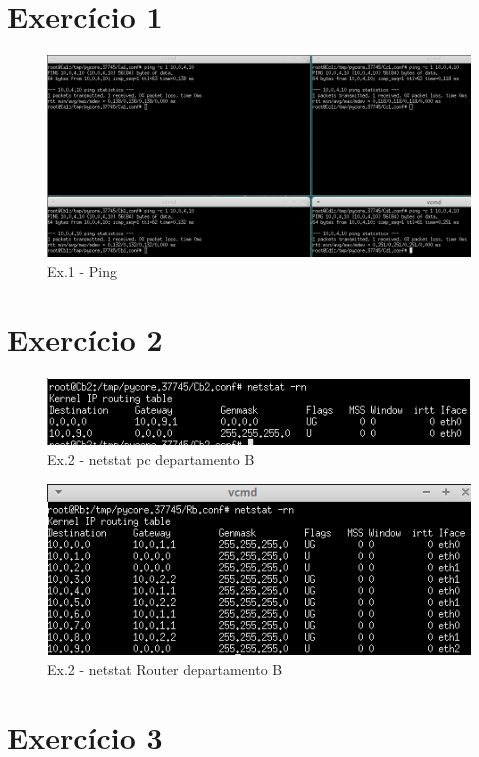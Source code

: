 \documentclass[a4paper]{report}
\begin{document}
\section{Exercício 1}

\begin{figure}[H]
    \centering 
    \includegraphics[width=\textwidth]{images/pingEx1P2.png}
    \caption{Ex.1 - Ping}
    \label{fig:pingEx1P2}
\end{figure}

\pagebreak
\section{Exercício 2}

\begin{figure}[H]
    \centering 
    \includegraphics[width=\textwidth]{images/netstatPcEx2P2.png}
    \caption{Ex.2 - netstat pc departamento B}
    \label{fig:netstatPcEx2P2}
\end{figure}

\begin{figure}[H]
    \centering 
    \includegraphics[width=\textwidth]{images/netstatRouterEx2P2.png}
    \caption{Ex.2 - netstat Router departamento B}
    \label{fig:netstatRouterEx2P2}
\end{figure}

\pagebreak
\section{Exercício 3}
\end{document}
